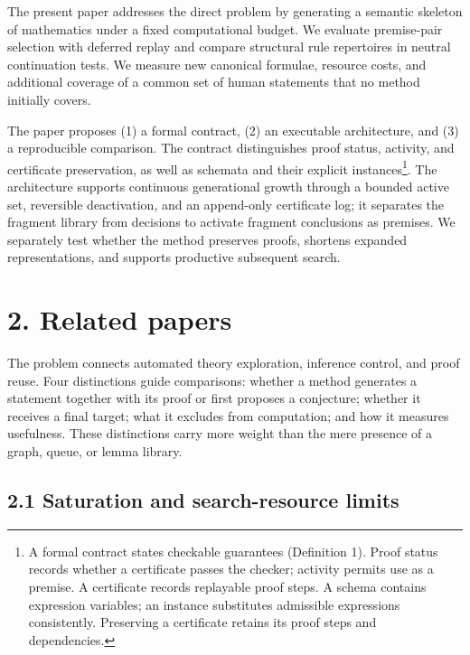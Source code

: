 \documentclass[pdflatex,sn-basic,Numbered]{sn-jnl}
\begin{document}
The present paper addresses the direct problem by generating a semantic skeleton of mathematics under a fixed computational budget. We evaluate premise-pair selection with deferred replay and compare structural rule repertoires in neutral continuation tests. We measure new canonical formulae, resource costs, and additional coverage of a common set of human statements that no method initially covers. 

The paper proposes (1) a formal contract, (2) an executable architecture, and (3) a reproducible comparison. The contract distinguishes proof status, activity, and certificate preservation, as well as schemata and their explicit instances\footnote{A formal contract states checkable guarantees (Definition 1). Proof status records whether a certificate passes the checker; activity permits use as a premise. A certificate records replayable proof steps. A schema contains expression variables; an instance substitutes admissible expressions consistently. Preserving a certificate retains its proof steps and dependencies.}. The architecture supports continuous generational growth through a bounded active set, reversible deactivation, and an append-only certificate log; it separates the fragment library from decisions to activate fragment conclusions as premises. We separately test whether the method preserves proofs, shortens expanded representations, and supports productive subsequent search. 

\section*{2. Related papers}\label{related-papers}

The problem connects automated theory exploration, inference control, and proof reuse. Four distinctions guide comparisons: whether a method generates a statement together with its proof or first proposes a conjecture; whether it receives a final target; what it excludes from computation; and how it measures usefulness. These distinctions carry more weight than the mere presence of a graph, queue, or lemma library.

\subsection*{2.1 Saturation and search-resource limits}\label{saturation-and-search-resource-limits}
\end{document}
